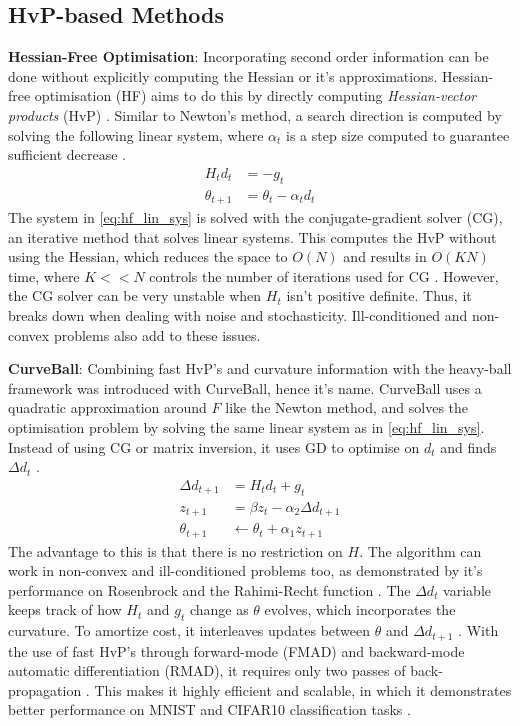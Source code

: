 \subsection{HvP-based Methods}
\textbf{Hessian-Free Optimisation}: Incorporating second order information can be done without explicitly computing the Hessian or it's approximations. Hessian-free optimisation (HF) aims to do this by directly computing \textit{Hessian-vector products} (HvP) \citep{NoceWrig06, martens2010hessianfree}. Similar to Newton's method, a search direction is computed by solving the following linear system, where $\alpha_t$ is a step size computed to guarantee sufficient decrease \citep{martens2010hessianfree}.
\begin{align}
    H_t d_t &= - g_t \\ \label{eq:hf_lin_sys}
    \theta_{t+1} &= \theta_t - \alpha_t d_t
\end{align}
The system in \cref{eq:hf_lin_sys} is solved with the conjugate-gradient solver (CG), an iterative method that solves linear systems. This computes the HvP without using the Hessian, which reduces the space to $O(N)$ and results in $O(KN)$ time, where $K << N$ controls the number of iterations used for CG \citep{martens2010hessianfree}. However, the CG solver can be very unstable when $H_t$ isn't positive definite. Thus, it breaks down when dealing with noise and stochasticity. Ill-conditioned and non-convex problems also add to these issues.

\textbf{CurveBall}: Combining fast HvP's and curvature information with the heavy-ball framework was introduced with CurveBall, hence it's name. CurveBall uses a quadratic approximation around $F$ like the Newton method, and solves the optimisation problem by solving the same linear system as in \cref{eq:hf_lin_sys}. Instead of using CG or matrix inversion, it uses GD to optimise on $d_t$ and finds $\Delta d_t$ \cite{henriques2019small}. 
\begin{align}
\Delta d_{t+1} &= H_t d_t + g_t \\
z_{t+1} &= \beta z_{t} - \alpha_2 \Delta d_{t+1} \\
\theta_{t+1} &\leftarrow \theta_t + \alpha_1 z_{t+1}
\end{align}
The advantage to this is that there is no restriction on $H$. The algorithm can work in non-convex and ill-conditioned problems too, as demonstrated by it's performance on Rosenbrock and the Rahimi-Recht function \citep{henriques2019small}. The $\Delta d_{t}$ variable keeps track of how $H_t$ and $g_t$ change as $\theta$ evolves, which incorporates the curvature. To amortize cost, it interleaves updates between $\theta$ and $\Delta d_{t+1}$ \citep{henriques2019small}. With the use of fast HvP's through forward-mode (FMAD) and backward-mode automatic differentiation (RMAD), it requires only two passes of back-propagation \citep{henriques2019small}. This makes it highly efficient and scalable, in which it demonstrates better performance on MNIST and CIFAR10 classification tasks \citep{henriques2019small}.  

